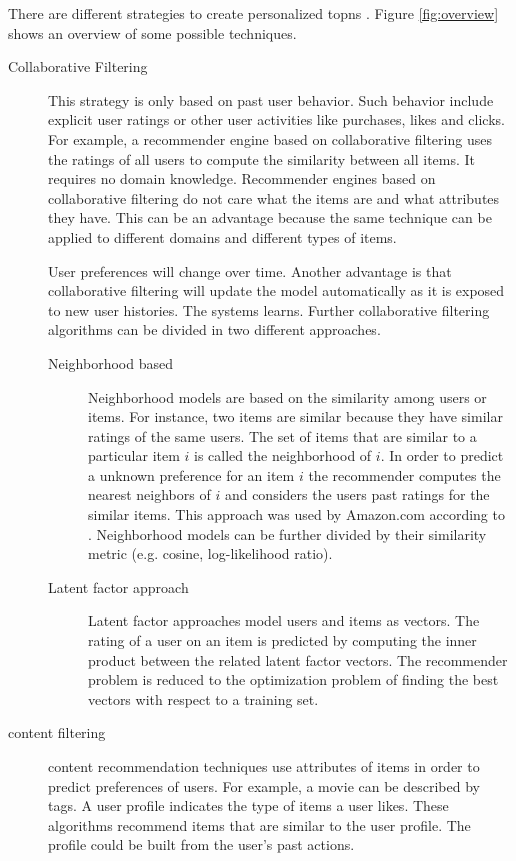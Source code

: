 There are different strategies to create personalized \glspl{topn} \cite{jannach11}. Figure \ref{fig:overview} shows an overview of some possible techniques.



\begin{description}
\item[Collaborative Filtering] This strategy is only based on past user behavior. Such behavior include explicit user ratings or other user activities like purchases, likes and clicks. For example, a recommender engine based on collaborative filtering uses the ratings of all users to compute the similarity between all items. 
It requires no domain knowledge. Recommender engines based on collaborative filtering do not care what the items are and what attributes they have. This can be an advantage because the same technique can be applied to different domains and different types of items. 

User preferences will change over time. Another advantage is that collaborative filtering will update the model automatically as it is exposed to new user histories. The systems learns.
Further collaborative filtering algorithms can be divided in two different approaches.
\begin{description}
\item[Neighborhood based] Neighborhood models are based on the similarity among users or items. For instance, two items are similar because they have similar ratings of the same users. The set of items that are similar to a particular item $i$ is called the neighborhood of $i$. In order to predict a unknown preference for an item $i$ the recommender computes the nearest neighbors of $i$ and considers the users past ratings for the similar items. This approach was used by Amazon.com according to \cite{Linden}. Neighborhood models can be further divided by their similarity metric (e.g. cosine, log-likelihood ratio).
\item[Latent factor approach] Latent factor approaches model users and items as vectors. The rating of a user on an item is predicted by computing the inner product between the related latent factor vectors. The recommender problem is reduced to the optimization problem of finding the best vectors with respect to a training set.
\end{description}
\item[\gls{content} filtering] \gls{content} recommendation techniques use attributes of items in order to predict preferences of users. For example, a movie can be described by \glspl{tag}. A user profile indicates the type of items a user likes. These algorithms recommend items that are similar to the user profile. The profile could be built from the user's past actions.
\end{description}

